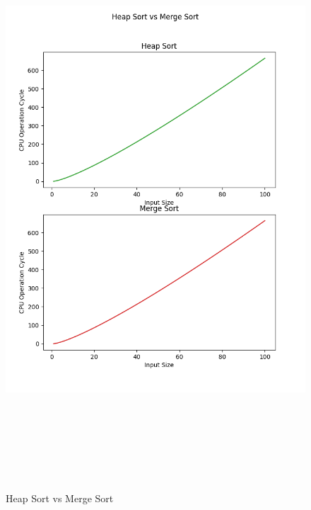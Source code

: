 \documentclass{article}
\begin{document}
\begin{figure}[h]
    \centerline{\includegraphics[width=7in,height=8.5in]{Heap Sort_Merge Sort.png}}
    \caption{Heap Sort vs Merge Sort}
\end{figure}
\end{document}
